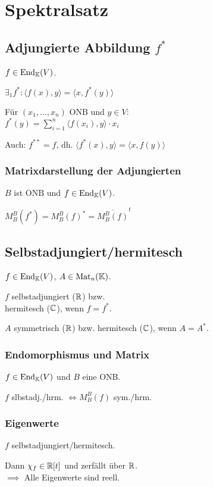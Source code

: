 \section*{Spektralsatz}

\subsection*{Adjungierte Abbildung $f^*$}
$f\in\operatorname{End}_{\mathbb{K}}(V)$.

$\exists_1 f^*:\langle f(x),y \rangle = \langle x, f^*(y) \rangle$

Für $(x_1,\dots,x_n)$ ONB und $y\in V$: \\
$\displaystyle f^*(y)=\sum_{i=1}^n \langle f(x_i),y \rangle \cdot x_i$

Auch: $f^{**}=f$, dh. $\langle f^*(x),y\rangle = \langle x,f(y)\rangle$

\subsubsection*{Matrixdarstellung der Adjungierten}
$B$ ist ONB und $f\in\operatorname{End}_{\mathbb{K}}(V)$.

$M_B^B(f^*)=M_B^B(f)^* = \overline{M_B^B(f)}^t$

\subsection*{Selbstadjungiert/hermitesch}
$f\in\operatorname{End}_{\mathbb{K}}(V)$, $A\in\operatorname{Mat}_n(\mathbb{K})$.

$f$ selbstadjungiert ($\mathbb{R}$) bzw. \\ hermitesch ($\mathbb{C}$), wenn $f=f^*$.

$A$ symmetrisch ($\mathbb{R}$) bzw. hermitesch ($\mathbb{C}$), wenn $A=A^*$.

\subsubsection*{Endomorphismus und Matrix}
$f\in\operatorname{End}_{\mathbb{K}}(V)$ und $B$ eine ONB.

$f$ slbstadj./hrm. $\iff M_B^B(f)$ sym./hrm.

\subsubsection*{Eigenwerte}
$f$ selbstadjungiert/hermitesch.

Dann $\chi_f \in\mathbb{R}[t]$ und zerfällt über $\mathbb{R}$. \\
$\implies$ Alle Eigenwerte sind reell.

